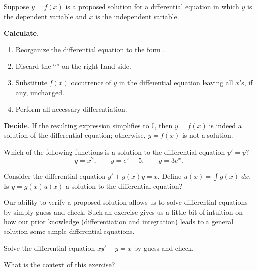 \documentclass[../main.tex]{subfiles}
\begin{document}
\begin{mdframed}[style=simple-compact]
  Suppose \(y = f(x)\) is a proposed solution for a differential equation in which \(y\) is the dependent variable and \(x\) is the independent variable. 

  \textbf{Calculate}.
  \begin{enumerate}
    \item Reorganize the differential equation to the form .
    \item Discard the ``'' on the right-hand side. 
    \item Substitute \(f(x)\)  occurrence of \(y\) in the differential equation leaving all \(x\)'s, if any, unchanged.
    \item Perform all necessary differentiation. 
  \end{enumerate} 

  \textbf{Decide}. If the resulting expression simplifies to \(0\), then \(y = f(x)\) is indeed a solution of the differential equation; otherwise, \(y = f(x)\) is not a solution.
\end{mdframed}
\clearpage

\begin{example}
  Which of the following functions is a solution to the differential equation \(y' = y\)?
  \[
    y = x^{2}, \qquad y = e^{x} + 5, \qquad y = 3e^{x}.
  \]

\end{example}

\begin{example}
  Consider the differential equation \(y' + g(x) y = x\). Define \(u(x) = \int g(x) \;dx\). Is \(y = g(x)u(x)\) a solution to the differential equation?

\end{example}
\clearpage

Our ability to verify a proposed solution allows us to solve differential equations by simply guess and check. Such an exercise gives us a little bit of intuition on how our prior knowledge (differentiation and integration) leads to a general solution some simple differential equations.
\begin{example}
  Solve the differential equation \(xy' - y = x\) by guess and check.
\end{example}

\clearpage

What is the context of this exercise?
\end{document}
